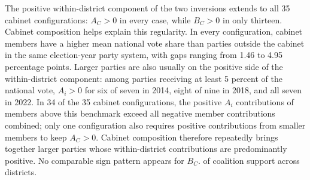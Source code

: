 \documentclass[11pt]{article}
\begin{document}



The positive within-district component of the two inversions extends to all 35
cabinet configurations: \(A_C>0\) in every case, while \(B_C>0\) in only
thirteen. Cabinet composition helps explain this regularity. In every
configuration, cabinet members have a higher mean national vote share than
parties outside the cabinet in the same election-year party system, with gaps
ranging from 1.46 to 4.95 percentage points. Larger parties are also usually on
the positive side of the within-district component: among parties receiving at
least 5 percent of the national vote, \(A_i>0\) for six of seven in 2014, eight
of nine in 2018, and all seven in 2022. In 34 of the 35 cabinet configurations,
the positive \(A_i\) contributions of members above this benchmark exceed all
negative member contributions combined; only one configuration also requires
positive contributions from smaller members to keep \(A_C>0\). Cabinet
composition therefore repeatedly brings together larger parties whose
within-district contributions are predominantly positive. No comparable sign
pattern appears for \(B_C\). of coalition support across
districts.
\end{document}
